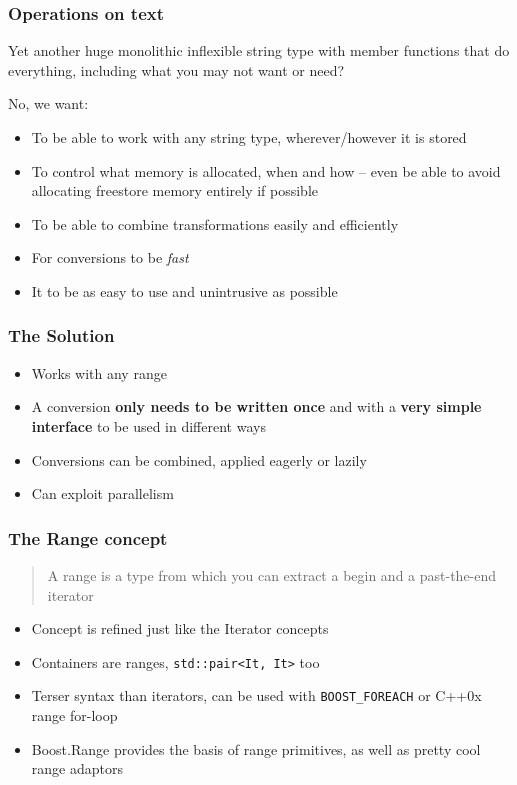 \documentclass{beamer}
\begin{document}
\begin{frame}
	\frametitle{Operations on text}
	
	Yet another huge monolithic inflexible string type with member functions that do everything,
	including what you may not want or need?
	\bigskip
	
	No, we want:
	\begin{itemize}
		\item To be able to work with any string type, wherever/however it is stored
		\item To control what memory is allocated, when and how -- even be able to avoid allocating freestore memory entirely if possible
		\item To be able to combine transformations easily and efficiently
		\item For conversions to be \textit{fast}
		\item It to be as easy to use and unintrusive as possible
	\end{itemize}

\end{frame}

\begin{frame}
	\frametitle{The Solution}
	
	\begin{itemize}
		\item Works with any range
		\item A conversion \textbf{only needs to be written once} and with a \textbf{very simple interface} to be used in different ways
		\item Conversions can be combined, applied eagerly or lazily
		\item Can exploit parallelism
	\end{itemize}
	
\end{frame}

\begin{frame}[fragile]
	\frametitle{The Range concept}
	
	\begin{quote}
	A range is a type from which you can extract a begin and a past-the-end iterator
	\end{quote}	
	
	\begin{itemize}
		\item Concept is refined just like the Iterator concepts
		\item Containers are ranges, \lstinline{std::pair<It, It>} too
		\item Terser syntax than iterators, can be used with \lstinline{BOOST_FOREACH} or C++0x range for-loop
		\item Boost.Range provides the basis of range primitives, as well as pretty cool range adaptors
	\end{itemize}

\end{frame}
\end{document}

